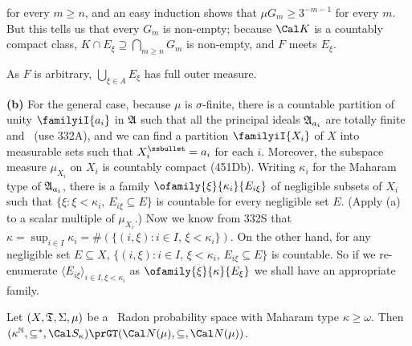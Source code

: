 {

\noindent for every $m\ge n$, and an easy induction shows that
$\mu G_m\ge 3^{-m-1}$ for every $m$.   But this tells us that every
$G_m$ is non-empty;  because $\Cal K$ is a countably compact class,
$K\cap E_{\xi}\supseteq\bigcap_{m\ge n}G_m$ is non-empty, and $F$ meets
$E_{\xi}$.

As $F$ is arbitrary, $\bigcup_{\xi\in A}E_{\xi}$ has full outer measure.

\medskip

{\bf (b)} For the general case, because $\mu$ is $\sigma$-finite, there
is a countable partition of unity $\familyiI{a_i}$ in
$\frak A$ such that all the principal ideals
$\frak A_{a_i}$ are totally finite and \Mth\ (use 332A),
and we can find a partition $\familyiI{X_i}$ of $X$ into measurable sets
such that $X_i^{\ssbullet}=a_i$ for each $i$.   Moreover, the subspace
measure $\mu_{X_i}$ on $X_i$ is countably compact (451Db).
Writing $\kappa_i$ for the Maharam type of $\frak A_{a_i}$, there is a
family $\ofamily{\xi}{\kappa_i}{E_{i\xi}}$ of negligible subsets of
$X_i$ such that $\{\xi:\xi<\kappa_i,\,E_{i\xi}\subseteq E\}$ is
countable for every negligible set $E$.
(Apply (a) to a scalar multiple of
$\mu_{X_i}$.)   Now we know from 332S that
$\kappa=\sup_{i\in I}\kappa_i=\#(\{(i,\xi):i\in I,\,\xi<\kappa_i\})$.
On the other hand, for any negligible set $E\subseteq X$,
$\{(i,\xi):i\in I,\,\xi<\kappa_i,\,E_{i\xi}\subseteq E\}$ is countable.
So if we re-enumerate $\langle E_{i\xi}\rangle_{i\in I,\xi<\kappa_i}$ as
$\ofamily{\xi}{\kappa}{E_{\xi}}$ we shall have an appropriate family.
}%

 Let $(X,\frak T,\Sigma,\mu)$ be a
\Mth\ Radon probability space with Maharam type $\kappa\ge\omega$.   Then
$(\kappa^{\Bbb N},\subseteq^*,\Cal S_{\kappa})
\prGT(\Cal N(\mu),\subseteq\penalty+100,\Cal N(\mu))$.

